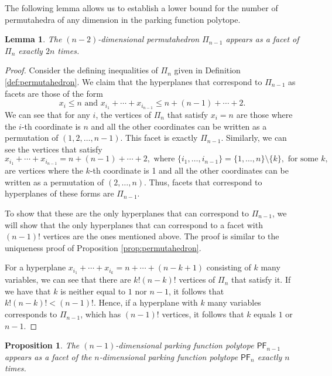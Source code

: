 \documentclass[11pt]{amsart}
\newtheorem{proposition}[theorem]{Proposition}
\newtheorem{lemma}[theorem]{Lemma}
\theoremstyle{definition}
\newcommand{\0}{\emptyset}
\newcommand{\PF}{\mathsf{PF}}
\begin{document}
The following lemma allows us to establish a lower bound for the number of permutahedra of any dimension in the parking function polytope.

\begin{lemma}
The $(n-2)$-dimensional permutahedron $\Pi_{n-1}$ appears as a facet of $\Pi_{n}$ exactly $2n$ times.
\end{lemma}


\begin{proof}
Consider the defining inequalities of $\Pi_{n}$ given in Definition \ref{def:permutahedron}.
We claim that the hyperplanes that correspond to $\Pi_{n-1}$ as facets are those of the form \[x_i \leq n \text{ and } x_{i_1} + \cdots + x_{i_{n-1}}\leq n + (n-1) + \cdots +2.\] 
We can see that for any $i$, the vertices of $\Pi_n$ that satisfy $x_i = n$ are those where the $i$-th coordinate is $n$ and all the other coordinates can be written as a permutation of $(1,2,\dots, n-1)$. 
This facet is exactly $\Pi_{n-1}$.
Similarly, we can see the vertices that satisfy  \[x_{i_1} + \cdots + x_{i_{n-1}} = n + (n-1) + \cdots +2, \text{ where } \{i_1,\dots, i_{n-1}\} = \{1,\ldots, n\} \setminus \{k\}, \text{ for  some } k,\] are vertices where the $k$-th coordinate is 1 and all the other coordinates can be written as a permutation of $(2,\dots, n)$. 
Thus, facets that correspond to hyperplanes of these forms are $\Pi_{n-1}$.


To show that these are the only hyperplanes that can correspond to $\Pi_{n-1}$, we will show that the only hyperplanes that can correspond to a facet with $(n-1)!$ vertices are the ones mentioned above.  
The proof is similar to the uniqueness proof of Proposition \ref{prop:permutahedron}.

For a hyperplane $x_{i_1} + \cdots +x_{i_k} = n + \cdots + (n-k+1)$ consisting of $k$ many variables, we can see that there are $k!(n-k)!$ vertices of $\Pi_n$ that satisfy it. If we have that $k$ is neither equal to $1$ nor $n-1$, it follows that $k!(n-k)!<(n-1)!$. 
Hence, if a hyperplane with $k$ many variables corresponds to $\Pi_{n-1}$, which has $(n-1)!$ vertices, it follows that $k$ equals $1$ or $n-1$.
\end{proof}


\begin{proposition}
The $(n-1)$-dimensional parking function polytope $\PF_{n-1}$ appears as a facet of the $n$-dimensional parking function polytope $\PF_n$ exactly $n$ times.
\end{proposition}
\end{document}
